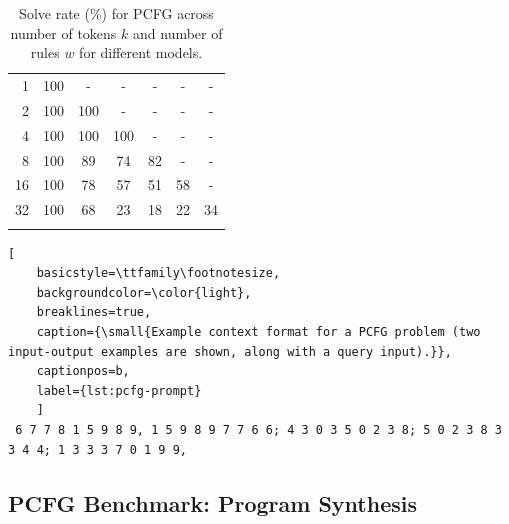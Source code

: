 \begin{table}[h]
{\begin{tabular}{@{}rcccccc@{}}
    \midrule
    1&100&-&-&-&-&- \\
    2&100&100&-&-&-&- \\
    4&100&100&100&-&-&- \\
    8&100&89&74&82&-&- \\
    16&100&78&57&51&58&- \\
    32&100&68&23&18&22&34 \\
    \bottomrule
    \vspace{-0.5em}
    \end{tabular}
    \vspace{-1.0em}
    \caption{
    \small
    Solve rate (\%) for PCFG across number of tokens $k$ and number of rules $w$ for different models.
    }
    \label{tab:pcfg-results-kw}
}

\end{table}

\begin{lstlisting}[
    basicstyle=\ttfamily\footnotesize,
    backgroundcolor=\color{light},
    breaklines=true,
    caption={\small{Example context format for a PCFG problem (two input-output examples are shown, along with a query input).}},
    captionpos=b,
    label={lst:pcfg-prompt}
    ]
 6 7 7 8 1 5 9 8 9, 1 5 9 8 9 7 7 6 6; 4 3 0 3 5 0 2 3 8; 5 0 2 3 8 3 3 4 4; 1 3 3 3 7 0 1 9 9, 
\end{lstlisting}

\subsection{PCFG Benchmark: Program Synthesis}
\label{app:pcfg-dreamcoder}



